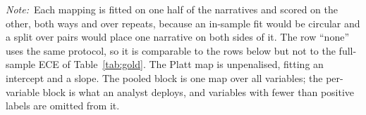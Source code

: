 \begin{table}[pos=!htbp]
\begin{threeparttable}
\begin{tablenotes}[flushleft]
\item \textit{Note:}~Each mapping is fitted on one half of the narratives and scored on the other, both ways and over \RecalRepeats{} repeats, because an in-sample fit would be circular and a split over pairs would place one narrative on both sides of it. The row ``none'' uses the same protocol, so it is comparable to the rows below but not to the full-sample ECE of Table~\ref{tab:gold}. The Platt map is unpenalised, fitting an intercept and a slope. The pooled block is one map over all variables; the per-variable block is what an analyst deploys, and variables with fewer than \RecalMinPositives{} positive labels are omitted from it.
\end{tablenotes}
\end{threeparttable}
\end{table}
